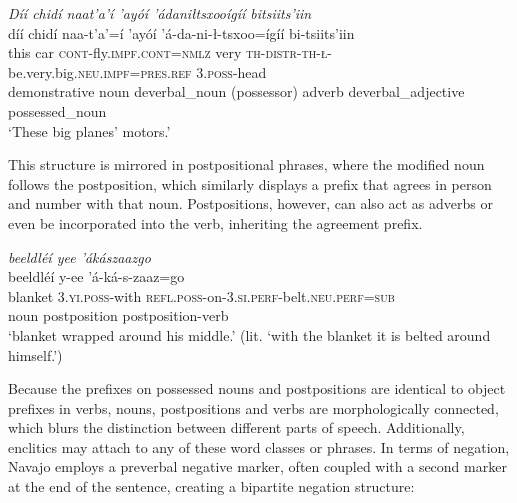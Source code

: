 \ea\label{ex:intro3}
    \textit{Díí chidí naat’a’í ’ayóí ’ádaniłtsxooígíí bitsiits’iin}\\
    \glll \textup{díí} \textup{chidí} \textup{naa-t’a’=í} \textup{’ayóí} \textup{’á-da-ni-ł-tsxoo=ígíí} \textup{bi-tsiits’iin}\\
	this car \textsc{cont}-fly.\textsc{impf}.\textsc{cont}=\textsc{nmlz} very	\textsc{th}-\textsc{distr}-\textsc{th}-\textsc{ł}-be.very.big.\textsc{neu}.\textsc{impf}=\textsc{pres}.\textsc{ref} 3.\textsc{poss}-head\\
    demonstrative noun {deverbal\_noun (possessor)} adverb {deverbal\_adjective} {possessed\_noun}\\
    \glt `These big planes' motors.' 
\z

This structure is mirrored in postpositional phrases, where the modified noun follows the postposition, which similarly displays a prefix that agrees in person and number with that noun. Postpositions, however, can also act as adverbs or even be incorporated into the verb, inheriting the agreement prefix.

\ea\label{ex:intro4}
    \textit{beeldléí yee ’ákászaazgo}\\
    \glll \textup{beeldléí} \textup{y-ee} \textup{’á-ká-s-zaaz=go}\\
    blanket 3.\textsc{yi}.\textsc{poss}-with \textsc{refl}.\textsc{poss}-on-3.\textsc{si}.\textsc{perf}-belt.\textsc{neu}.\textsc{perf}=\textsc{sub}\\
    noun postposition postposition-verb\\
    \glt `blanket wrapped around his middle.' (lit. `with the blanket it is belted around himself.') 
\z

Because the prefixes on possessed nouns and postpositions are identical to object prefixes in verbs, nouns, postpositions and verbs are morphologically connected, which blurs the distinction between different parts of speech. Additionally, enclitics may attach to any of these word classes or phrases. In terms of negation, Navajo employs a preverbal negative marker, often coupled with a second marker at the end of the sentence, creating a bipartite negation structure:

